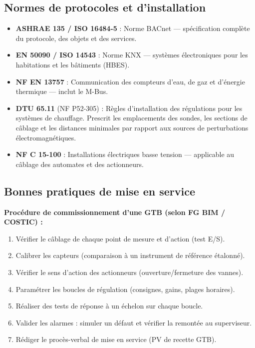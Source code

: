 \subsection{Normes de protocoles et d'installation}

\begin{itemize}
  \item \textbf{ASHRAE 135 / ISO 16484-5} : Norme BACnet — spécification complète du protocole, des objets et des services.
  \item \textbf{EN 50090 / ISO 14543} : Norme KNX — systèmes électroniques pour les habitations et les bâtiments (HBES).
  \item \textbf{NF EN 13757} : Communication des compteurs d'eau, de gaz et d'énergie thermique — inclut le M-Bus.
  \item \textbf{DTU 65.11} (NF P52-305) : Règles d'installation des régulations pour les systèmes de chauffage. Prescrit les emplacements des sondes, les sections de câblage et les distances minimales par rapport aux sources de perturbations électromagnétiques.
  \item \textbf{NF C 15-100} : Installations électriques basse tension — applicable au câblage des automates et des actionneurs.
\end{itemize}

\subsection{Bonnes pratiques de mise en service}

\begin{methode}
  \textbf{Procédure de commissionnement d'une GTB (selon FG BIM / COSTIC) :}
  \begin{enumerate}
    \item Vérifier le câblage de chaque point de mesure et d'action (test E/S).
    \item Calibrer les capteurs (comparaison à un instrument de référence étalonné).
    \item Vérifier le sens d'action des actionneurs (ouverture/fermeture des vannes).
    \item Paramétrer les boucles de régulation (consignes, gains, plages horaires).
    \item Réaliser des tests de réponse à un échelon sur chaque boucle.
    \item Valider les alarmes : simuler un défaut et vérifier la remontée au superviseur.
    \item Rédiger le procès-verbal de mise en service (PV de recette GTB).
  \end{enumerate}
\end{methode}

